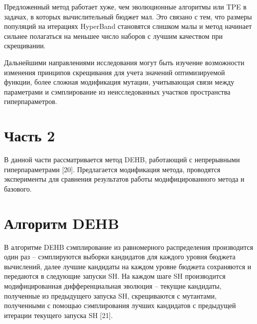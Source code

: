 \documentclass[a4paper,12pt]{article}
\begin{document}
Предложенный метод работает хуже, чем эволюционные алгоритмы или TPE в задачах, в которых вычислительный бюджет мал. Это связано с тем, что размеры популяций на итерациях HyperBand становятся слишком малы и метод начинает сильнее полагаться на меньшее число наборов с лучшим качеством при скрещивании.

Дальнейшими направлениями исследования могут быть изучение возможности изменения принципов скрещивания для учета значений оптимизируемой функции, более сложная модификация мутации, учитывающая связи между параметрами и сэмплирование из неисследованных участков пространства гиперпараметров.


\section{Часть 2}
В данной части рассматривается метод DEHB, работающий с непрерывными гиперпараметрами [20]. Предлагается модификация метода, проводятся эксперименты для сравнения результатов работы модифицированного метода и базового.

\section{Алгоритм DEHB}
В алгоритме DEHB сэмплирование из равномерного распределения производится один раз – сэмплируются выборки кандидатов для каждого уровня бюджета вычислений, далее лучшие кандидаты на каждом уровне бюджета сохраняются и передаются в следующие запуски SH. На каждом шаге SH производится модифицированная дифференциальная эволюция – текущие кандидаты, полученные из предыдущего запуска SH, скрещиваются с мутантами, полученными с помощью сэмплирования лучших кандидатов с предыдущей итерации текущего запуска SH [21].
\end{document}
